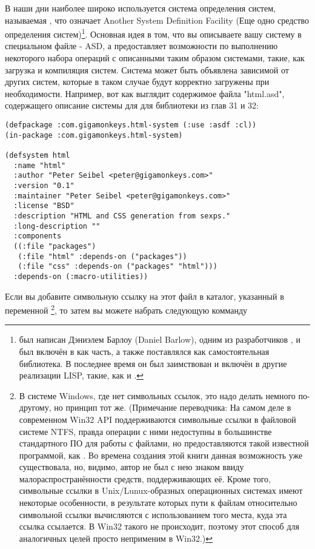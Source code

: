В наши дни наиболее широко используется система определения систем, называемая
, что означает Another System Definition Facility (Еще одно средство
определения систем)\footnote{ был написан Дэниэлем Барлоу (Daniel Barlow),
  одним из разработчиков , и был включён в  как часть, а также
  поставлялся как самостоятельная библиотека. В последнее время он был заимствован и
  включён в другие реализации LISP, такие, как  и .}. Основная
идея  в том, что вы описываете вашу систему в специальном файле - ASD, а
 предоставляет возможности по выполнению некоторого набора операций с
описанными таким образом системами, такие, как загрузка и компиляция систем. Система может
быть объявлена зависимой от других систем, которые в таком случае будут корректно
загружены при необходимости. Например, вот как выглядит содержимое файла "html.asd",
содержащего описание системы для  для библиотеки  из глав 31 и 32:

\begin{lstlisting}
(defpackage :com.gigamonkeys.html-system (:use :asdf :cl))
(in-package :com.gigamonkeys.html-system)

(defsystem html
  :name "html"
  :author "Peter Seibel <peter@gigamonkeys.com>"
  :version "0.1"
  :maintainer "Peter Seibel <peter@gigamonkeys.com>"
  :license "BSD"
  :description "HTML and CSS generation from sexps."
  :long-description ""
  :components
  ((:file "packages")
   (:file "html" :depends-on ("packages"))
   (:file "css" :depends-on ("packages" "html")))
  :depends-on (:macro-utilities))
\end{lstlisting}

Если вы добавите символьную ссылку на этот файл в каталог, указанный в переменной
\footnote{В системе Windows, где нет символьных ссылок, это
  надо делать немного по-другому, но принцип тот же. (Примечание переводчика: На самом
  деле в современном Win32 API поддерживаются символьные ссылки в файловой системе NTFS,
  правда операции с ними недоступны в большинстве стандартного ПО для работы с файлами, но
  предоставляются такой известной программой, как . Во времена создания этой
  книги данная возможность уже существовала, но, видимо, автор не был с нею знаком ввиду
  малораспространённости средств, поддерживающих её. Кроме того, символьные ссылки в
  Unix/Lunux-образных операционных системах имеют некоторые особенности, в результате
  которых пути к файлам относительно символьной ссылки вычисляются с использованием того
  места, куда эта ссылка ссылается. В Win32 такого не происходит, поэтому этот способ для
  аналогичных целей просто неприменим в Win32.) }, то затем вы можете набрать следующую
комманду

